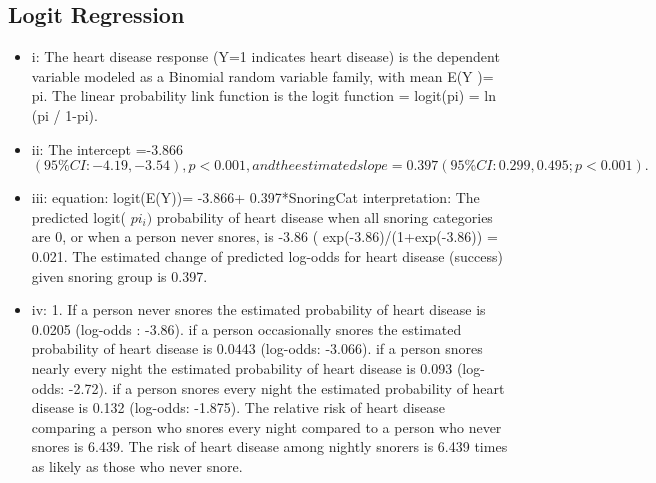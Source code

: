 \documentclass{article}
\begin{document}
 \subsection{Logit Regression}
 \begin{itemize}
     \item i:   The heart disease response (Y=1 indicates heart disease) is the dependent variable modeled as a Binomial random variable family, with mean E(Y )= pi.  The linear probability link function is the logit function = logit(pi) = ln (pi / 1-pi). 
     \item ii:  The intercept =-3.866 $(95\%CI: -4.19, -3.54), p<0.001, and the estimated slope= 0.397 (95\% CI : 0.299,0.495; p<0.001).$
     \item iii:  equation: logit(E(Y))= -3.866+ 0.397*SnoringCat interpretation: The predicted logit( $pi_i)$ probability of heart disease when all snoring categories are 0, or when a person never snores, is -3.86 ( exp(-3.86)/(1+exp(-3.86)) = 0.021.  The estimated change of predicted log-odds for heart disease (success) given snoring group is 0.397.
 \item iv: 1. If a person never snores the estimated probability of heart disease is 0.0205 (log-odds : -3.86).
 if a person occasionally snores the estimated probability of heart disease is 0.0443 (log-odds: -3.066).
 if a person snores nearly every night the estimated probability of heart disease is 0.093 (log-odds: -2.72).
 if a person snores every night the estimated probability of heart disease is 0.132 (log-odds: -1.875).
The relative risk of heart disease comparing a person who snores every night compared to a person who never snores is 6.439.  The risk of heart disease among nightly snorers is 6.439 times as likely as those who never snore.
 \end{itemize}
 
\end{document}
